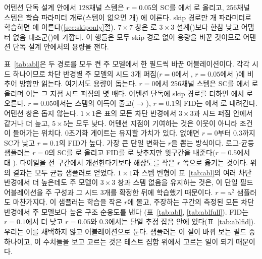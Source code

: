 \documentclass[10pt,twocolumn,a4paper]{article}
\begin{document}
어텐션 단독 설계 안에서 128채널 스템은 $r{=}0.05$의 SC를 \scEaZeroFive{}에서
\scEcapZeroFive{}로 올리고, 256채널 스템은 학습 파라미터 \paramsCapb{}개로(스템이 없으면
\paramsAttnOnly{}개) \scEcapbZeroFive{}에 이른다. skip 경로만 \paramsSkipOnly{}개 파라미터로
학습하면 \skipOnlyZeroFive{}에 이른다(\ref{sec:skiponly}절). $7{\times}7$ 창은
\scEwinZeroFive{}로 $3{\times}3$ 설계(\scEaZeroFive{})보다 한참 낮고 어댑터 없음
대조군(\pathAllOffZeroFive{})에 가깝다. 이 행들은 모두 skip 경로 없이 용량을 바꾼 것이므로
어텐션 단독 설계 안에서의 용량을 잰다.

표~\ref{tab:abl}은 두 경로를 모두 켠 주 모델에서 한 필드씩 바꾼 어블레이션이다. 각각 시드
하나이므로 차단 반경별 주 모델의 시드 3개 퍼짐($r{=}0$에서 \sSdZero{}, $r{=}0.05$에서
\sSdZeroFive{})에 비추어 방향만 읽는다. 여기서도 용량이 돕는다. $r{=}0$에서 256채널 스템은
SC를 \scMainZero{}에서 \ablStemskipZero{}로 올리며 이는 그 지점 시드 퍼짐의 몇 배다.
어텐션 단독에 skip 경로를 더하면 \pathAttnOnlyZero{}에서 \pathBothZero{}로 오른다.
$r{=}0.05$에서는 스템의 이득이 줄고(\scMainZeroFive{} → \ablStemskipZeroFive{}), $r{=}0.1$의
FID는 \fidMainOneZero{}에서 \ablFidStemskipOneZero{}로 내려간다. 어텐션 창은 돕지 않는다.
$1{\times}1$은 표의 모든 차단 반경에서 $3{\times}3$과 시드 퍼짐 안에서 같거나 더 높고,
$5{\times}5$는 모두 낮다. 어텐션 지점이 기여하는 것은 이웃이 아니라 조건이 들어가는
위치다. 0초기화 게이트는 유지할 가치가 있다. 없애면 $r{=}0$부터 $0.3$까지 SC가 낮고
$r{=}0.1$의 FID가 높다. 가장 큰 단일 변화는 $r$을 뽑는 방식이다. 로그-균등 샘플러는
$r{=}0$의 SC를 \ablLogZero{}로 올리고 FID를 \ablFidLogZero{}로 낮추지만 윗구간을
내준다($r{=}0.5$에서 \ablLogFiveZero{} 대 \scMainFiveZero{}). 다이얼을 전 구간에서 개선한다기보다
해상도를 작은 $r$ 쪽으로 옮기는 것이다. 위의 결과는 모두 균등 샘플러로 얻었다. $1{\times}1$과
스템 변형이 표~\ref{tab:abl}의 여러 차단 반경에서 더 높은데도 주 모델이 $3{\times}3$ 창과 스템
없음을 유지하는 것은, 이 단일 필드 어블레이션을 주 구성과 그 시드 3개를 확정한 뒤에
학습했기 때문이다. $r{=}u^2$ 샘플러도 마찬가지다. 이 샘플러는 학습을 작은 $r$에 몰고,
주장하는 구간의 측정된 모든 차단 반경에서 주 모델보다 높은 구조 순응도를 낸다
(표~\ref{tab:abl}, \ref{tab:ablfull}). FID는 $r{=}0.1$에서 더 낮고 $r{=}0.05$와 $0.3$에서는
단일 추정 잡음 안에 있다(표~\ref{tab:ablfid}). 우리는 이를 채택하지 않고 어블레이션으로
둔다. 샘플러는 이 절이 바꿔 보는 필드 중 하나이고, 이 수치들을 보고 고르는 것은 테스트
집합 위에서 고르는 일이 되기 때문이다.
\end{document}
